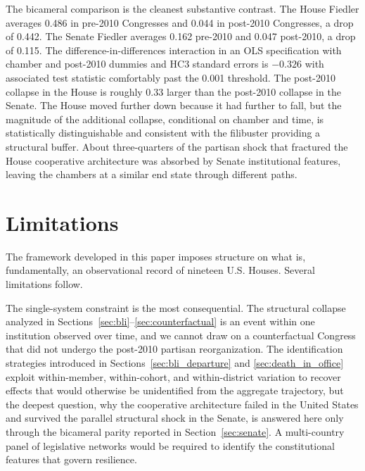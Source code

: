 \documentclass[12pt, a4paper]{article}
\begin{document}
The bicameral comparison is the cleanest substantive contrast. The House Fiedler averages 0.486 in pre-2010 Congresses and 0.044 in post-2010 Congresses, a drop of 0.442. The Senate Fiedler averages 0.162 pre-2010 and 0.047 post-2010, a drop of 0.115. The difference-in-differences interaction in an OLS specification with chamber and post-2010 dummies and HC3 standard errors is $-0.326$ with associated test statistic comfortably past the 0.001 threshold. The post-2010 collapse in the House is roughly 0.33 larger than the post-2010 collapse in the Senate. The House moved further down because it had further to fall, but the magnitude of the additional collapse, conditional on chamber and time, is statistically distinguishable and consistent with the filibuster providing a structural buffer. About three-quarters of the partisan shock that fractured the House cooperative architecture was absorbed by Senate institutional features, leaving the chambers at a similar end state through different paths.

\section{Limitations}

The framework developed in this paper imposes structure on what is, fundamentally, an observational record of nineteen U.S. Houses. Several limitations follow.

The single-system constraint is the most consequential. The structural collapse analyzed in Sections~\ref{sec:bli}--\ref{sec:counterfactual} is an event within one institution observed over time, and we cannot draw on a counterfactual Congress that did not undergo the post-2010 partisan reorganization. The identification strategies introduced in Sections~\ref{sec:bli_departure} and \ref{sec:death_in_office} exploit within-member, within-cohort, and within-district variation to recover effects that would otherwise be unidentified from the aggregate trajectory, but the deepest question, why the cooperative architecture failed in the United States and survived the parallel structural shock in the Senate, is answered here only through the bicameral parity reported in Section~\ref{sec:senate}. A multi-country panel of legislative networks would be required to identify the constitutional features that govern resilience.
\end{document}

